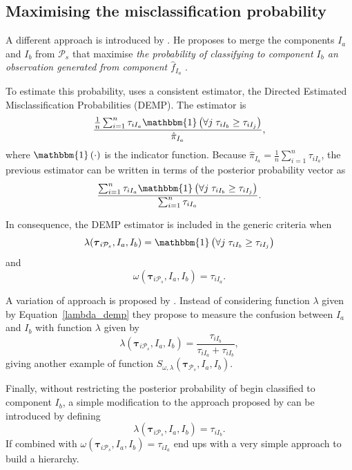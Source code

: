 \documentclass[submit]{smj}
\theoremstyle{definition}
\newcommand{\m}[1]{\boldsymbol{#1}}
\begin{document}
\subsection{Maximising the misclassification probability}
\label{missclassification_section}

A different approach is introduced by \cite{hennig2010methods}. He proposes to merge the components $I_a$ and $I_b$ from $ \mathcal{P}_s$ that maximise \emph{the probability of classifying to component $I_b$ an observation generated from component $\hat{f}_{I_a}$ }.

To estimate this probability,  \cite{hennig2010methods} uses a consistent estimator, the Directed Estimated Misclassification Probabilities (DEMP). The estimator is
\[
\frac{ \frac{1}{n} \sum_{i=1}^n {\tau_{iI_a} \mathbbm{1}\left( \forall j\; \tau_{i I_{b}} \geq \tau_{iI_j} \right)}}{ \hat{\pi}_{I_a}},
\]
where $\mathbbm{1}\left( \cdot \right)$ is the indicator function. Because $ \hat{\pi}_{I_a} = \frac{1}{n} \sum_{i=1}^n \tau_{iI_a}$, the previous estimator can be written in terms of the posterior probability vector as
\begin{equation}\label{demp_criteria}
\frac{ \sum_{i=1}^n {\tau_{iI_a} \mathbbm{1}\left( \forall j\; \tau_{i I_{b}} \geq \tau_{iI_j} \right)}}{\sum_{i=1}^n \tau_{iI_a} }.
\end{equation}

In consequence, the DEMP estimator is included in the generic criteria when
\begin{equation}\label{lambda_demp}
\lambda(\m\tau_{i \mathcal{P}_s},  I_a,  I_b) = \mathbbm{1}\left( \forall j\; \tau_{i I_{b}} \geq \tau_{iI_j} \right)
\end{equation}
and
\[
\omega(\m\tau_{i \mathcal{P}_s},  I_a,  I_b) =  \tau_{iI_a}.
\]

A variation of \cite{hennig2010methods} approach is proposed by \cite{longford2014}. Instead of considering function $\lambda$ given by Equation~\ref{lambda_demp} they propose to measure the confusion between $I_a$ and $I_b$ with function $\lambda$ given by
\[
\lambda(\m\tau_{i \mathcal{P}_s},  I_a,  I_b) = \frac{\tau_{iI_b}}{\tau_{iI_a} + \tau_{iI_b}},
\]
giving another example of function $S_{\omega, \lambda}( \m\tau_{\mathcal{P}_s},  I_a,  I_b)$.

Finally, without restricting  the posterior probability of begin classified to component $I_b$, a simple modification to the approach proposed by \cite{longford2014} can be introduced by defining
\[
\lambda(\m\tau_{i \mathcal{P}_s},  I_a,  I_b) = \tau_{iI_b}.
\]
If combined with $\omega(\m\tau_{i \mathcal{P}_s},  I_a,  I_b) =  \tau_{iI_a}$ end ups with a very simple approach to build a hierarchy.
\end{document}
